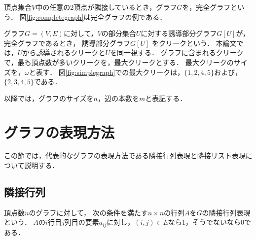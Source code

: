 頂点集合$V$中の任意の2頂点が隣接しているとき，グラフ$G$を，完全グラフという．
図\ref{fig:completegraph}は完全グラフの例である．

グラフ$G = (V,E)$に対して，$V$の部分集合$U$に対する誘導部分グラフ$G[U]$が，完全グラフであるとき，
誘導部分グラフ$G[U]$
をクリークという．
本論文では，$U$から誘導されるクリークと$U$を同一視する．
グラフに含まれるクリークで，最も頂点数が多いクリークを，最大クリークとする．
最大クリークのサイズを，$\omega$と表す．
図\ref{fig:simplegraph}での最大クリークは，$\{1,2,4,5\}$および，$\{2,3,4,5\}$である．

以降では，グラフのサイズを$n$，辺の本数を$m$と表記する．



\section{グラフの表現方法}
\label{sec:graph_represetion}
この節では，代表的なグラフの表現方法である隣接行列表現と隣接リスト表現について説明する．
\subsection{隣接行列}
\label{sec:neighbormatrix}
\begin{comment}
隣接行列とは，グラフの隣接関係を表す行列である．
グラフ$G=(V,E)$の隣接行列を$A$とすると，
$A$は，0と1で構成される
$n\times n$行列である．
$A_{u,v}$は，頂点$u,v \in V$が隣接しているとき1であり，隣接していないとき0である．
\end{comment}
頂点数$n$のグラフに対して，
次の条件を満たす$n \times n$の行列$A$を$G$の隣接行列表現という．
$A$の$i$行目$j$列目の要素$a_{ij}$に対し，$(i,j)\in E$なら1，そうでないなら0である．

